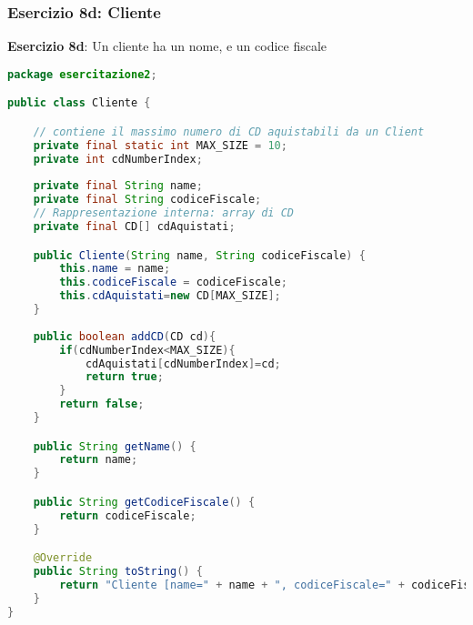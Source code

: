 \documentclass{article}
\begin{document}
\subsubsection{Esercizio 8d: Cliente}
\begin{framed}
\textbf{Esercizio 8d}: Un cliente ha un nome,  e un codice fiscale
\end{framed}
\begin{lstlisting}[language=Java,escapechar=|]
package esercitazione2;

public class Cliente {

	// contiene il massimo numero di CD aquistabili da un Client
	private final static int MAX_SIZE = 10;
	private int cdNumberIndex;
	
	private final String name;
	private final String codiceFiscale;
	// Rappresentazione interna: array di CD
	private final CD[] cdAquistati;

	public Cliente(String name, String codiceFiscale) {
		this.name = name;
		this.codiceFiscale = codiceFiscale;
		this.cdAquistati=new CD[MAX_SIZE];
	}
	
	public boolean addCD(CD cd){
		if(cdNumberIndex<MAX_SIZE){
			cdAquistati[cdNumberIndex]=cd;
			return true;
		}
		return false;
	}

	public String getName() {
		return name;
	}

	public String getCodiceFiscale() {
		return codiceFiscale;
	}

	@Override
	public String toString() {
		return "Cliente [name=" + name + ", codiceFiscale=" + codiceFiscale+ "]";
	}
}
\end{lstlisting}
\end{document}
